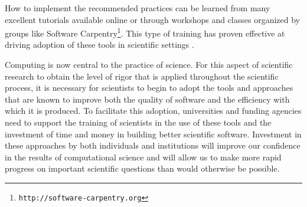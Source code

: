 \documentclass{article}
\newcommand{\footurl}[1]{\footnote{\texttt{#1}}}
\begin{document}
How to implement the recommended practices can be learned from many
excellent tutorials available online or through workshops and classes
organized by groups like Software
Carpentry\footurl{http://software-carpentry.org}. This type of
training has proven effective at driving adoption of these tools in
scientific settings \cite{aranda2012}.

Computing is now central to the practice of science. For this aspect of
scientific research to obtain the level of rigor that is applied throughout the
scientific process, it is necessary for scientists to begin to adopt the tools
and approaches that are known to improve both the quality of software and the
efficiency with which it is produced. To facilitate this adoption, universities
and funding agencies need to support the training of scientists in the use of
these tools and the investment of time and money in building better scientific
software. Investment in these approaches by both individuals and institutions
will improve our confidence in the results of computational science and will
allow us to make more rapid progress on important scientific questions than
would otherwise be possible.



\end{document}

